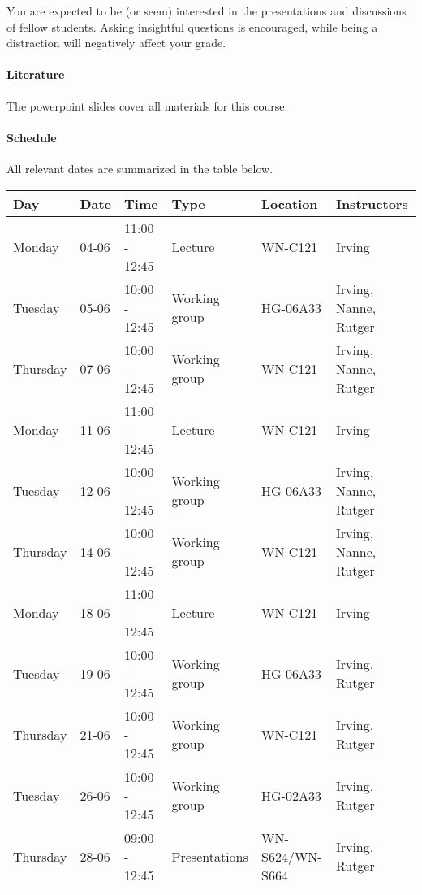 \documentclass[a4paper]{report}
\begin{document}
You are expected to be (or seem) interested in the presentations and discussions of fellow students. Asking insightful questions is encouraged, while being a distraction will negatively affect your grade.

\paragraph{Literature}
The powerpoint slides cover all materials for this course.

\paragraph{Schedule}
All relevant dates are summarized in the table below.

\begin{table}[h!]
	\begin{tabular}{| l | l | l | l | l | l |}
		\hline
		\textbf{Day}	&	\textbf{Date}	& \textbf{Time}	& \textbf{Type}			& \textbf{Location}	& \textbf{Instructors}	\\
		\hline
		Monday			&	04-06			& 11:00 - 12:45	& Lecture				& WN-C121			& Irving				\\
		Tuesday			&	05-06			& 10:00 - 12:45	& Working group			& HG-06A33			& Irving, Nanne, Rutger	\\
		Thursday		&	07-06			& 10:00 - 12:45	& Working group			& WN-C121			& Irving, Nanne, Rutger	\\
		\hline
		Monday			&	11-06			& 11:00 - 12:45	& Lecture				& WN-C121			& Irving				\\
		Tuesday			&	12-06			& 10:00 - 12:45	& Working group			& HG-06A33			& Irving, Nanne, Rutger	\\
		Thursday		&	14-06			& 10:00 - 12:45	& Working group			& WN-C121			& Irving, Nanne, Rutger	\\
		\hline
		Monday			&	18-06			& 11:00 - 12:45	& Lecture				& WN-C121			& Irving				\\
		Tuesday			&	19-06			& 10:00 - 12:45	& Working group			& HG-06A33			& Irving, Rutger	\\
		Thursday		&	21-06			& 10:00 - 12:45	& Working group			& WN-C121			& Irving, Rutger	\\
		\hline
		Tuesday			&	26-06			& 10:00 - 12:45	& Working group			& HG-02A33			& Irving, Rutger	\\
		Thursday		&	28-06			& 09:00 - 12:45	& Presentations			& WN-S624/WN-S664	& Irving, Rutger	\\
		\hline
	\end{tabular}
\end{table}
\end{document}

